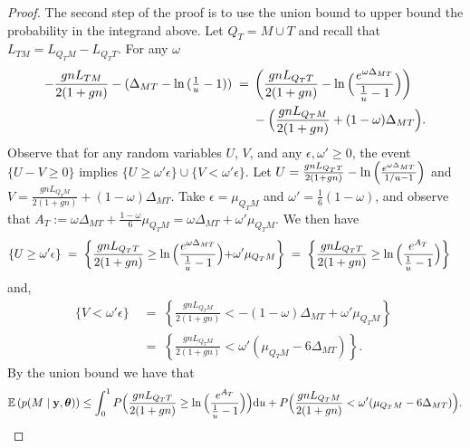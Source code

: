 \documentclass[
  12pt]{article}
\newcommand{\E}{\mathbb{E}}
\newcommand{\by}{\mathbf{y}}
\newcommand{\btheta}{\boldsymbol{\theta}}
\begin{document}
\begin{proof}
The second step of the proof is to use the union bound to upper bound the probability in the integrand above.
Let $Q_T=M \cup T$ and recall that $L_{TM}=L_{Q_TM}-L_{Q_TT}$. For any $\omega$ 
\begin{align*}
    -\frac{g nL_{TM}}{2 (1+g n)} -(\Delta_{MT}-\ln{(\tfrac1u-1)})\;=\;
    &\left(\frac{g nL_{Q_TT}}{2 (1+g n)} -\ln{\Bigl(\frac{e^{\omega\Delta_{MT}}}{\tfrac1u-1}\Bigl)}\right)\\
    &-\Bigl(\frac{g nL_{Q_TM}}{2 (1+g n)} +(1-\omega)\Delta_{MT}\Bigl).
\end{align*}
Observe that for any random variables $U$, $V$, and any $\epsilon,\omega' \geq 0$, the event $
\{U-V \geq 0\}$ implies $\{U \geq \omega' \epsilon\}\cup
\{V  < \omega' \epsilon\}$. Let $U=\frac{g nL_{Q_TT}}{2 (1+g n)}-\ln{\Bigl(\frac{e^{\omega\Delta_{MT}}}{1/u-1}\Bigl)}$ and $V=\frac{g nL_{Q_TM}}{2 (1+g n)}+(1-\omega)\Delta_{MT}$. Take $\epsilon=\mu_{Q_TM}$ and $\omega'=\tfrac16({1-\omega})$, and observe that
$A_T:=\omega\Delta_{MT}+\tfrac{1-\omega}{6}\mu_{Q_TM}= \omega\Delta_{MT}+\omega'\mu_{Q_TM}$. We then have
\begin{align*}
\{U\geq \omega'\epsilon\}\;&=\;\left\{\frac{g nL_{Q_TT}}{2 (1+g n)}\geq \ln{\Bigl(\frac{e^{\omega\Delta_{MT}}}{\tfrac1u-1}}\Bigl)+\omega'\mu_{Q_TM}\right\}\;=\;\left\{\frac{g nL_{Q_TT}}{2 (1+g n)}\geq \ln{\Bigl(\frac{e^{A_T}}{\tfrac1u-1}}\Bigl)\right\}
\end{align*}
and,
\begin{align*}
\{V<\omega'\epsilon\}\;
&=\;\left\{\frac{g nL_{Q_TM}}{2 (1+g n)}<-(1-\omega)\Delta_{MT}+\omega'\mu_{Q_TM}\right\}\;\\
&=\;\left\{\frac{g nL_{Q_TM}}{2 (1+g n)}<\omega'(\mu_{Q_TM}-6\Delta_{MT})\right\}.
\end{align*}
By the union bound we have that
\begin{equation}\label{eq:prooflemmas20nonspu2}
    \E\left(p(M\mid \by,\btheta)\right)  \leq \int_0^1P\Bigl(\frac{g nL_{Q_TT}}{2 (1+g n)}\geq \ln{\Bigl(\frac{e^{A_T}}{\tfrac1u-1}\Bigl)}\Bigl){\rm d}u+ P\Bigl(\frac{g nL_{Q_TM}}{2 (1+g n)}<\omega'(\mu_{Q_TM}-6\Delta_{MT})\Bigl).
\end{equation}


\end{proof}
\end{document}
